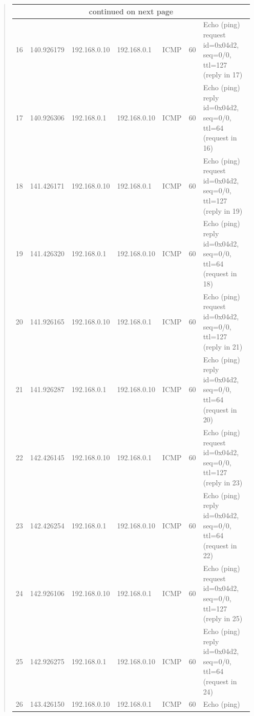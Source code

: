 \documentclass{article}
\newenvironment{ans}
   {\fbox{Answer}\begin{quote}\nopagebreak}
   {\end{quote}}
\newcommand\INFOCOLSIZE{13em}
\begin{document}
\begin{ans}
\begin{center}
\begin{longtable}{|l|l|l|l|l|l|p{\INFOCOLSIZE}|}
\hline
\multicolumn{7}{|c|}{{continued on next page}}                                                                 \\
\hline
\endfoot

\hline
\hline
\endlastfoot

16 & 140.926179 & 192.168.0.10 & 192.168.0.1 & ICMP & 60 & Echo (ping)
request id=0x04d2, seq=0/0, ttl=127 (reply in 17)                                                              \\
17 & 140.926306 & 192.168.0.1 & 192.168.0.10 & ICMP & 60 & Echo (ping)
reply id=0x04d2, seq=0/0, ttl=64 (request in 16)                                                               \\
18 & 141.426171 & 192.168.0.10 & 192.168.0.1 & ICMP & 60 & Echo (ping)
request id=0x04d2, seq=0/0, ttl=127 (reply in 19)                                                              \\
19 & 141.426320 & 192.168.0.1 & 192.168.0.10 & ICMP & 60 & Echo (ping)
reply id=0x04d2, seq=0/0, ttl=64 (request in 18)                                                               \\
20 & 141.926165 & 192.168.0.10 & 192.168.0.1 & ICMP & 60 & Echo (ping)
request id=0x04d2, seq=0/0, ttl=127 (reply in 21)                                                              \\
21 & 141.926287 & 192.168.0.1 & 192.168.0.10 & ICMP & 60 & Echo (ping)
reply id=0x04d2, seq=0/0, ttl=64 (request in 20)                                                               \\
22 & 142.426145 & 192.168.0.10 & 192.168.0.1 & ICMP & 60 & Echo (ping)
request id=0x04d2, seq=0/0, ttl=127 (reply in 23)                                                              \\
23 & 142.426254 & 192.168.0.1 & 192.168.0.10 & ICMP & 60 & Echo (ping)
reply id=0x04d2, seq=0/0, ttl=64 (request in 22)                                                               \\
24 & 142.926106 & 192.168.0.10 & 192.168.0.1 & ICMP & 60 & Echo (ping)
request id=0x04d2, seq=0/0, ttl=127 (reply in 25)                                                              \\
25 & 142.926275 & 192.168.0.1 & 192.168.0.10 & ICMP & 60 & Echo (ping)
reply id=0x04d2, seq=0/0, ttl=64 (request in 24)                                                               \\
26 & 143.426150 & 192.168.0.10 & 192.168.0.1 & ICMP & 60 & Echo (ping)

\end{longtable}
\end{center}
\end{ans}
\end{document}

